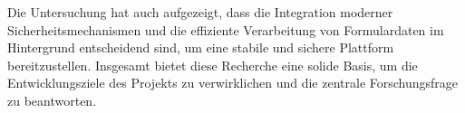 Die Untersuchung hat auch aufgezeigt, dass die Integration moderner Sicherheitsmechanismen und die effiziente Verarbeitung von Formulardaten im Hintergrund entscheidend sind, um eine stabile und sichere Plattform bereitzustellen. Insgesamt bietet diese Recherche eine solide Basis, um die Entwicklungsziele des Projekts zu verwirklichen und die zentrale Forschungsfrage zu beantworten.
